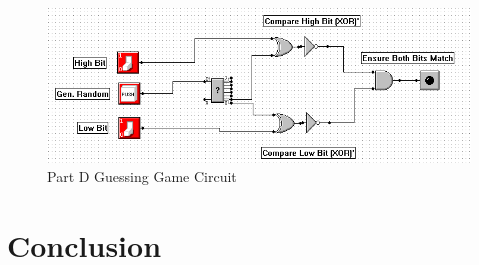 \documentclass[a4paper,11pt]{article}
\begin{document}
\begin{figure}[h!]
   \centering
     \includegraphics[width=6.5in]{partd}
   \caption{Part D Guessing Game Circuit}
   \label{fig:partd}
\end{figure}   


\section{Conclusion}
\end{document}
